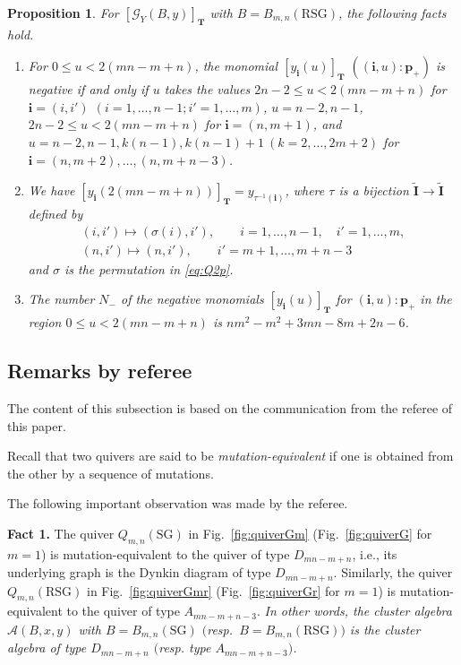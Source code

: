 \documentclass[pdftex]{sigma}
\numberwithin{equation}{section}
\newtheorem{Proposition}[Theorem]{Proposition}
\theoremstyle{definition}
\begin{document}
\begin{Proposition}
\label{prop:lev2mr}
 For
$[\mathcal{G}_Y(B,y)]_{\mathbf{T}}$
with $B=B_{m,n}(\mathrm{RSG})$, the following facts hold.
\begin{enumerate}\itemsep=0pt
\item[$(i)$]  For $0 \le u < 2(mn-m+n)$,
the  monomial $[y_{\mathbf{i}}(u)]_{\mathbf{T}}$
$((\mathbf{i},u):\mathbf{p}_+)$
is negative if and only if $u$ takes the values
$2n-2 \leq u < 2(mn-m+n)$
for $\mathbf{i}=(i,i')$ $(i=1,\dots,n-1;i'=1,\dots,m)$,
$u=n-2,n-1$, $2n-2 \leq u < 2(mn-m+n)$
for $\mathbf{i}=(n,m+1)$,
and
$u=n-2,n-1,k(n-1),k(n-1)+1\ (k=2,\dots,2m+2)$
for $\mathbf{i}=(n,m+2),\dots,(n,m+n-3)$.

\item[$(ii)$]
 We have $[y_{\mathbf{i}}(2(mn-m+n))]_{\mathbf{T}}
=y_{\tau^{-1}(\mathbf{i})}$,
where $\tau$ is a bijection $\tilde{\mathbf{I}} \rightarrow
\tilde{\mathbf{I}}$ defined by
\begin{gather*}
(i,i')   \mapsto (\sigma(i),i'),
\qquad i=1,\dots,n-1,\quad   i'=1,\dots,m,\\
(n,i')  \mapsto
(n,i'), \qquad i'=m+1,\dots,m+n-3
\end{gather*}
and $\sigma$ is the permutation in \eqref{eq:Q2p}.

\item[$(iii)$] The number $N_-$ of the negative monomials
$[y_{\mathbf{i}}(u)]_{\mathbf{T}}$ for $(\mathbf{i},u):\mathbf{p}_+$
in the region $0\leq u < 2(mn-m+n)$ is $nm^2-m^2+3mn-8m+ 2n-6$.
\end{enumerate}
\end{Proposition}


\subsection{Remarks by referee}
\label{subsec:mutseq}

The content of this subsection is based
on the communication from the referee of this paper.


Recall that two quivers are said to be {\em mutation-equivalent\/}
if one is obtained from the other by a sequence of  mutations.

The following important observation was made by the referee.

{\bf Fact 1.}
 The quiver $Q_{m,n}(\mathrm{SG})$ in
 Fig.~\ref{fig:quiverGm} (Fig.~\ref{fig:quiverG} for $m=1$)
is mutation-equivalent to the quiver of type $D_{mn-m+n}$,
i.e., its underlying graph is the Dynkin diagram of type
$D_{mn-m+n}$.
Similarly,
the quiver $Q_{m,n}(\mathrm{RSG})$ in
Fig.~\ref{fig:quiverGmr} (Fig.~\ref{fig:quiverGr}
for $m=1$)
is mutation-equivalent to the quiver of type $A_{mn-m+n-3}$.
{\em In other words,
the cluster algebra $\mathcal{A}(B,x,y)$
with $B=B_{m,n}(\mathrm{SG})$ $($resp.\ $B=B_{m,n}(\mathrm{RSG}))$
 is the cluster algebra
of type $D_{mn-m+n}$ $($resp. type $A_{mn-m+n-3})$.}
\end{document}
